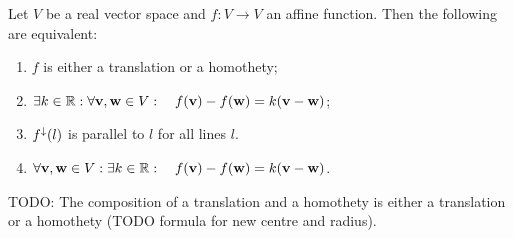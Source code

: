 \begin{proposition}
Let $V$ be a real vector space and $f:V\to V$ an affine function. Then
the following are equivalent:
\begin{enumerate}
\item $f$ is either a translation or a homothety;
\item $\exists k\in \mathbb{R}: \forall \boldsymbol{\mathrm{v}},\boldsymbol{\mathrm{w}}\in V: \quad f(\boldsymbol{\mathrm{v}}) - f(\boldsymbol{\mathrm{w}}) = k(\boldsymbol{\mathrm{v}}- \boldsymbol{\mathrm{w}})$;
\item $f^\downarrow(l)$ is parallel to $l$ for all lines $l$.
\item $\forall \boldsymbol{\mathrm{v}},\boldsymbol{\mathrm{w}}\in V: \exists k\in \mathbb{R}: \quad f(\boldsymbol{\mathrm{v}}) - f(\boldsymbol{\mathrm{w}}) = k(\boldsymbol{\mathrm{v}}-\boldsymbol{\mathrm{w}})$.
\end{enumerate}
\end{proposition}
TODO: The composition of a translation and a homothety is either a translation or a homothety (TODO formula for new centre and radius).
